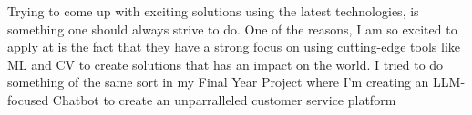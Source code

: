 



Trying to come up with exciting solutions using the latest technologies, is something one should always strive to do. One of the reasons, I am so excited to apply at \company is the fact that they have a strong focus on using cutting-edge tools like ML and CV to create solutions that has an impact on the world. I tried to do something of the same sort in my Final Year Project where I'm creating an LLM-focused Chatbot to create an unparralleled customer service platform